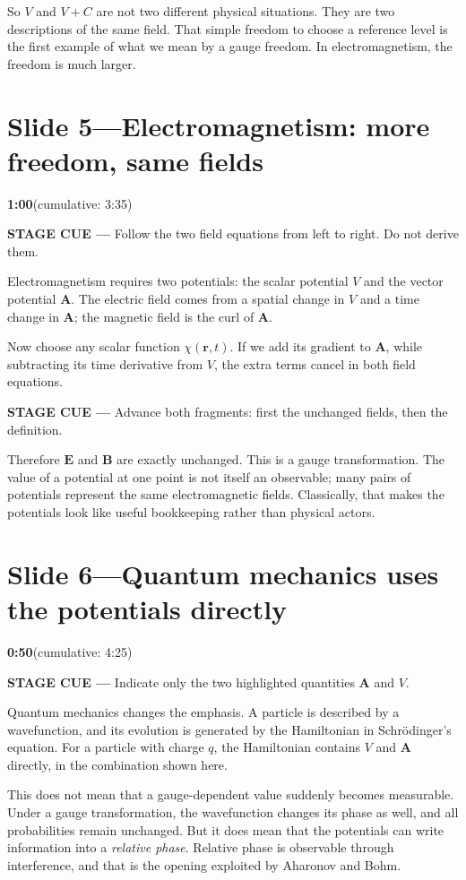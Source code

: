 \documentclass[a4paper,11pt]{article}
\newcommand{\slidetime}[2]{%
  {\small\sffamily\color{timegreen}\textbf{#1}\enspace(cumulative: #2)}%
}
\newcommand{\cue}[1]{%
  \par\smallskip
  \noindent
  {\small\sffamily\color{cueblue}\textbf{STAGE CUE ---} #1}
  \par\smallskip
}
\newenvironment{spoken}{%
  \begin{list}{}{%
    \setlength{\leftmargin}{1.1em}%
    \setlength{\rightmargin}{1.1em}%
    \setlength{\topsep}{2pt}%
    \setlength{\partopsep}{0pt}%
    \setlength{\parsep}{5pt}%
    \setlength{\itemsep}{0pt}}%
  \item\relax
}{\end{list}}
\newcommand{\slideheading}[4]{%
  \needspace{10\baselineskip}
  \section*{#1\enspace---\enspace#2}
  \vspace{-0.7em}
  \noindent\slidetime{#3}{#4}\par\smallskip
}
\begin{document}
\begin{spoken}
So \(V\) and \(V+C\) are not two different physical situations. They are two
descriptions of the same field. That simple freedom to choose a reference
level is the first example of what we mean by a gauge freedom. In
electromagnetism, the freedom is much larger.
\end{spoken}


\slideheading{Slide 5}{Electromagnetism: more freedom, same fields}{1:00}{3:35}

\cue{Follow the two field equations from left to right. Do not derive them.}

\begin{spoken}
Electromagnetism requires two potentials: the scalar potential \(V\) and the
vector potential \(\mathbf A\). The electric field comes from a spatial
change in \(V\) and a time change in \(\mathbf A\); the magnetic field is the
curl of \(\mathbf A\).

Now choose any scalar function \(\chi(\mathbf r,t)\). If we add its gradient
to \(\mathbf A\), while subtracting its time derivative from \(V\), the extra
terms cancel in both field equations.
\end{spoken}

\cue{Advance both fragments: first the unchanged fields, then the definition.}

\begin{spoken}
Therefore \(\mathbf E\) and \(\mathbf B\) are exactly unchanged. This is a
gauge transformation. The value of a potential at one point is not itself an
observable; many pairs of potentials represent the same electromagnetic
fields. Classically, that makes the potentials look like useful bookkeeping
rather than physical actors.
\end{spoken}


\slideheading{Slide 6}{Quantum mechanics uses the potentials directly}{0:50}{4:25}

\cue{Indicate only the two highlighted quantities \(\mathbf A\) and \(V\).}

\begin{spoken}
Quantum mechanics changes the emphasis. A particle is described by a
wavefunction, and its evolution is generated by the Hamiltonian in
Schrödinger's equation. For a particle with charge \(q\), the Hamiltonian
contains \(V\) and \(\mathbf A\) directly, in the combination shown here.

This does not mean that a gauge-dependent value suddenly becomes measurable.
Under a gauge transformation, the wavefunction changes its phase as well, and
all probabilities remain unchanged. But it does mean that the potentials can
write information into a \emph{relative phase}. Relative phase is observable
through interference, and that is the opening exploited by Aharonov and Bohm.
\end{spoken}
\end{document}
